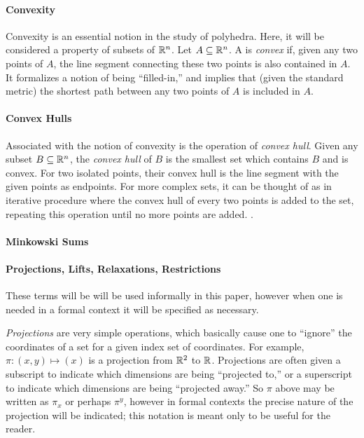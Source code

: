 \documentclass[a4,fleqn]{article}
\begin{document}
\paragraph{Convexity} Convexity is an essential notion in the study of polyhedra.  Here, it will be considered a property of subsets of $\mathbb{R}^n$.  Let $A \subseteq \mathbb{R}^n$.  A is \textit{convex} if, given any two points of $A$, the line segment connecting these two points is also contained in $A$.  It formalizes a notion of being ``filled-in,'' and implies that (given the standard metric) the shortest path between any two points of $A$ is included in $A$.  

\paragraph{Convex Hulls} Associated with the notion of convexity is the operation of \textit{convex hull}.  Given any subset $B \subseteq \mathbb{R}^n$, the \textit{convex hull} of $B$ is the smallest set which contains $B$ and is convex.  For two isolated points, their convex hull is the line segment with the given points as endpoints.  For more complex sets, it can be thought of as in iterative procedure where the convex hull of every two points is added to the set, repeating this operation until no more points are added. .

\paragraph{Minkowski Sums}

\paragraph{Projections, Lifts, Relaxations, Restrictions}  These terms will be will be used informally in this paper, however when one is needed in a formal context it will be specified as necessary.  

\textit{Projections} are very simple operations, which basically cause one to ``ignore'' the coordinates of a set for a given index set of coordinates.  For example, $\pi: (x,y) \mapsto (x)$ is a projection from $\mathbb{R}^2$ to $\mathbb{R}$.  Projections are often given a subscript to indicate which dimensions are being ``projected to,'' or a superscript to indicate which dimensions are being ``projected away.''  So $\pi$ above may be written as $\pi_x$ or perhaps $\pi^y$, however in formal contexts the precise nature of the projection will be indicated; this notation is meant only to be useful for the reader.
\end{document}
